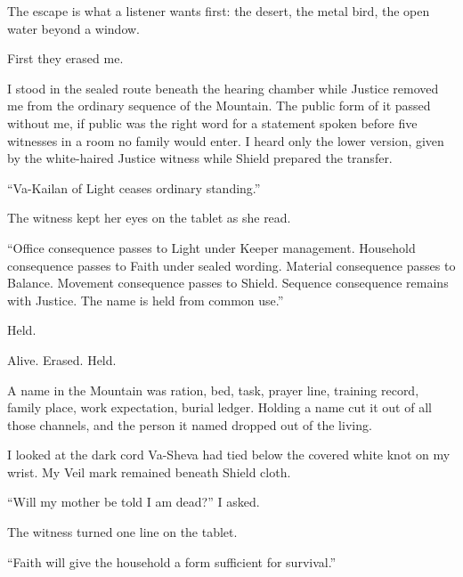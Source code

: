 

\ornament

The escape is what a listener wants first: the desert, the metal bird, the open water beyond a window.\par

First they erased me.\par

\ornament

I stood in the sealed route beneath the hearing chamber while Justice removed me from the ordinary sequence of the Mountain. The public form of it passed without me, if public was the right word for a statement spoken before five witnesses in a room no family would enter. I heard only the lower version, given by the white-haired Justice witness while Shield prepared the transfer.\par

``Va-Kailan of Light ceases ordinary standing.''\par

The witness kept her eyes on the tablet as she read.\par

``Office consequence passes to Light under Keeper management. Household consequence passes to Faith under sealed wording. Material consequence passes to Balance. Movement consequence passes to Shield. Sequence consequence remains with Justice. The name is held from common use.''\par

Held.\par

Alive. Erased. Held.\par

A name in the Mountain was ration, bed, task, prayer line, training record, family place, work expectation, burial ledger. Holding a name cut it out of all those channels, and the person it named dropped out of the living.\par

I looked at the dark cord Va-Sheva had tied below the covered white knot on my wrist. My Veil mark remained beneath Shield cloth.\par

``Will my mother be told I am dead?'' I asked.\par

The witness turned one line on the tablet.\par

``Faith will give the household a form sufficient for survival.''\par

